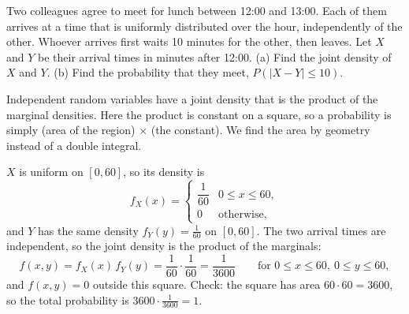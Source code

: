 
\begin{problem}
	Two colleagues agree to meet for lunch between 12:00 and 13:00. Each of
	them arrives at a time that is uniformly distributed over the hour,
	independently of the other. Whoever arrives first waits 10 minutes for the
	other, then leaves. Let $X$ and $Y$ be their arrival times in minutes after
	12:00.
	(a) Find the joint density of $X$ and $Y$.
	(b) Find the probability that they meet, $P(|X-Y|\le 10)$.
\end{problem}

\begin{solution}
	\idea Independent random variables have a joint density that is the product
	of the marginal densities. Here the product is constant on a square, so a
	probability is simply (area of the region)$\,\times\,$(the constant). We
	find the area by geometry instead of a double integral.

	 $X$ is uniform on $[0,60]$, so its density is
	\[
		f_X(x)=\begin{cases}
			\dfrac{1}{60} & 0\le x\le 60, \\[6pt]
			0             & \text{otherwise,}
		\end{cases}
	\]
	and $Y$ has the same density $f_Y(y)=\frac{1}{60}$ on $[0,60]$. The two
	arrival times are independent, so the joint density is the product of the
	marginals:
	\[
		f(x,y)=f_X(x)\,f_Y(y)=\frac{1}{60}\cdot\frac{1}{60}=\frac{1}{3600}
		\qquad\text{for } 0\le x\le 60,\ 0\le y\le 60,
	\]
	and $f(x,y)=0$ outside this square. Check: the square has area
	$60\cdot60=3600$, so the total probability is $3600\cdot\frac1{3600}=1$.


\end{solution}
